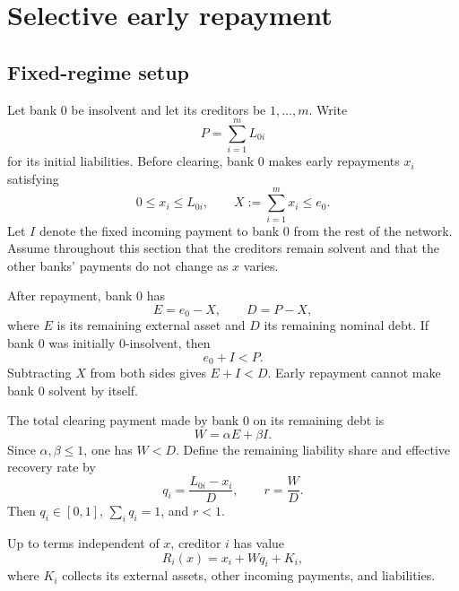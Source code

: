 \documentclass[11pt]{article}
\theoremstyle{definition}
\theoremstyle{remark}
\begin{document}
\section{Selective early repayment}

\subsection{Fixed-regime setup}

Let bank $0$ be insolvent and let its creditors be $1,\ldots,m$.  Write
\begin{equation}
  P=\sum_{i=1}^m L_{0i}
\end{equation}
for its initial liabilities.  Before clearing, bank $0$ makes early repayments
$x_i$ satisfying
\begin{equation}\label{eq:repayment-feasibility}
  0\leq x_i\leq L_{0i},
  \qquad
  X:=\sum_{i=1}^m x_i\leq e_0.
\end{equation}
Let $I$ denote the fixed incoming payment to bank $0$ from the rest of the
network.  Assume throughout this section that the creditors remain solvent and
that the other banks' payments do not change as $x$ varies.

After repayment, bank $0$ has
\begin{equation}
  E=e_0-X,
  \qquad
  D=P-X,
\end{equation}
where $E$ is its remaining external asset and $D$ its remaining nominal debt.
If bank $0$ was initially 0-insolvent, then
\begin{equation}
  e_0+I<P.
\end{equation}
Subtracting $X$ from both sides gives $E+I<D$.  Early repayment cannot make
bank $0$ solvent by itself.

The total clearing payment made by bank $0$ on its remaining debt is
\begin{equation}
  W=\alpha E+\beta I.
\end{equation}
Since $\alpha,\beta\leq1$, one has $W<D$.  Define the remaining liability share
and effective recovery rate by
\begin{equation}
  q_i=\frac{L_{0i}-x_i}{D},
  \qquad
  r=\frac{W}{D}.
\end{equation}
Then $q_i\in[0,1]$, $\sum_iq_i=1$, and $r<1$.

Up to terms independent of $x$, creditor $i$ has value
\begin{equation}\label{eq:creditor-value}
  R_i(x)=x_i+Wq_i+K_i,
\end{equation}
where $K_i$ collects its external assets, other incoming payments, and
liabilities.
\end{document}
